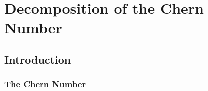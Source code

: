 \chapter{Decomposition of the Chern Number}

\ifpdf
    \graphicspath{{Chapter2/Chapter2Figs/PNG/}{Chapter2/Chapter2/PDF/}{Chapter2/Chapter2Figs/}}
\else
    \graphicspath{{Chapter2/Chapter2Figs/EPS/}{Chapter2/Chapter2/}}
\fi

\section{Introduction}



\subsection{The Chern Number}







